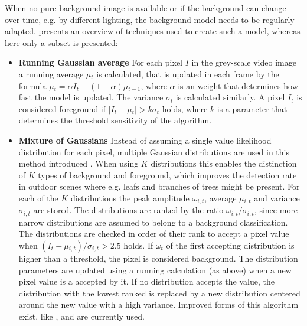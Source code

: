 When no pure background image is available 
or if the background can change over time, e.g. by different lighting,
the background model needs to be regularly adapted.
\textcite[][]{piccardi2004background} presents an overview of techniques used to create such a model, 
whereas here only a subset is presented:

\begin{itemize}
    
    \item \textbf{Running Gaussian average} For each pixel $ I $  in the grey-scale video image a running average $ \mu{}_t$ is calculated, that is updated in each frame by the formula $ \mu{}_t = \alpha{}I_t + (1 - \alpha)\mu{}_{t-1} $, where $ \alpha $ is an weight that determines how fast the model is updated. The variance $ \sigma{}_t $ is calculated similarly. A pixel $ I_t $ is considered foreground if $ |I_t - \mu{}_t| > k\sigma{}_t $ holds, where $ k $ is a parameter that determines the threshold sensitivity of the algorithm.
    \item \textbf{Mixture of Gaussians} Instead of assuming a single value likelihood distribution for each pixel, multiple Gaussian distributions are used in this method introduced \textcite[][]{stauffer1999background}. 
    When using $ K $ distributions this enables the distinction of $ K $ types of background and foreground, which improves the detection rate in outdoor scenes where e.g. leafs and branches of trees might be present. 
    For each of the $ K $ distributions the peak amplitude $ \omega{}_{i,t} $, average $ \mu{}_{i,t} $ and variance $ \sigma{}_{i,t} $ are stored.
    The distributions are ranked by the ratio $ \omega{}_{i,t} / \sigma{}_{i, t}$, since more narrow distributions are assumed to belong to a background classification.
    The distributions are checked in order of their rank to accept a pixel value when $ (I_t - \mu{}_{i,t})/\sigma{}_{i,t} > 2.5 $ holds.
    If $ \omega{}_{t} $ of the first accepting distribution is higher than a threshold, the pixel is considered background.
    The distribution parameters are updated using a running calculation (as above) when a new pixel value is a accepted by it.
    If no distribution accepts the value, the distribution with the lowest ranked is replaced by a new distribution centered around the new value with a high variance.
    Improved forms of this algorithm exist, like \autocite[][]{chan2011background}, and are currently used.
    
\end{itemize}

